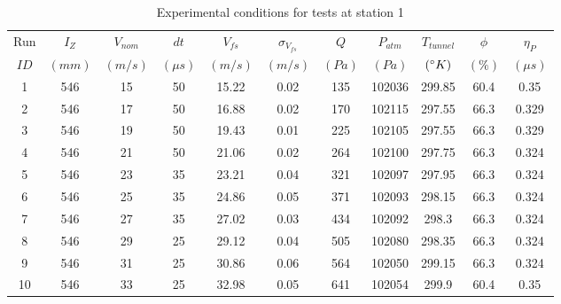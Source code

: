 \begin{table}[H]
\begin{center}
\begin{tabular}{|ccccccccccc|}
	\hline
	Run & $I_Z$ & $V_{nom}$ & $dt$ & $V_{fs}$ & $\sigma_{V_{fs}}$ & $Q$ & $P_{atm}$ & $T_{tunnel}$ & $\phi$ & $\eta_P$\\
	$ID$ & $(mm)$ & $(m/s)$ & $(\mu s)$ & $(m/s)$ & $(m/s)$ & $(Pa)$ & $(Pa)$ & $(\degree K)$ & $(\%)$ & $(\mu s)$\\
	\hline
	1 & 546 & 15 & 50 & 15.22 & 0.02 & 135 & 102036 & 299.85 & 60.4 & 0.35\\
	2 & 546 & 17 & 50 & 16.88 & 0.02 & 170 & 102115 & 297.55 & 66.3 & 0.329\\
	3 & 546 & 19 & 50 & 19.43 & 0.01 & 225 & 102105 & 297.55 & 66.3 & 0.329\\
	4 & 546 & 21 & 50 & 21.06 & 0.02 & 264 & 102100 & 297.75 & 66.3 & 0.324\\
	5 & 546 & 23 & 35 & 23.21 & 0.04 & 321 & 102097 & 297.95 & 66.3 & 0.324\\
	6 & 546 & 25 & 35 & 24.86 & 0.05 & 371 & 102093 & 298.15 & 66.3 & 0.324\\
	7 & 546 & 27 & 35 & 27.02 & 0.03 & 434 & 102092 & 298.3 & 66.3 & 0.324\\
	8 & 546 & 29 & 25 & 29.12 & 0.04 & 505 & 102080 & 298.35 & 66.3 & 0.324\\
	9 & 546 & 31 & 25 & 30.86 & 0.06 & 564 & 102050 & 299.15 & 66.3 & 0.324\\
	10 & 546 & 33 & 25 & 32.98 & 0.05 & 641 & 102054 & 299.9 & 60.4 & 0.35\\
	\hline
\end{tabular}
\caption{Experimental conditions for tests at station 1}
\label{table:station_1_measurements}
\end{center}
\end{table}
